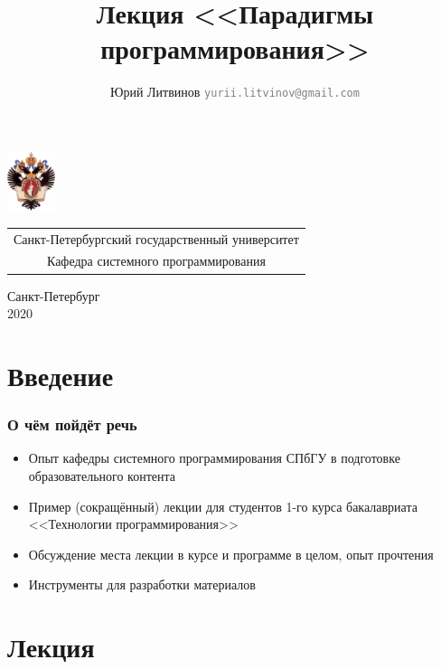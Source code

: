 \documentclass[xetex,mathserif,serif]{beamer}
\title{Лекция <<Парадигмы программирования>>}
\author[Юрий Литвинов]{Юрий Литвинов \newline \textcolor{gray}{\small\texttt{yurii.litvinov@gmail.com}}}
\date{}
\begin{document}
{
\begin{frame}
  \includegraphics[width=1.4cm]{pictures/SPbGU_Logo.png}
\vspace{-35pt}
\hspace{-10pt}
\begin{center}
   \begin{tabular}{c}
        \scriptsize{Санкт-Петербургский государственный университет} \\
        \scriptsize{Кафедра системного программирования}
    \end{tabular}
\titlepage
\end{center}

\btVFill

\begin{center}
  \vspace{5pt}
  \scriptsize{Санкт-Петербург\\
                 2020}
  \end{center}

\end{frame}
}

    \section{Введение}

    \begin{frame}
        \frametitle{О чём пойдёт речь}
        \begin{itemize}
            \item Опыт кафедры системного программирования СПбГУ в подготовке образовательного контента
            \item Пример (сокращённый) лекции для студентов 1-го курса бакалавриата <<Технологии программирования>>
            \item Обсуждение места лекции в курсе и программе в целом, опыт прочтения
            \item Инструменты для разработки материалов
        \end{itemize}
    \end{frame}

    \section{Лекция}
\end{document}

